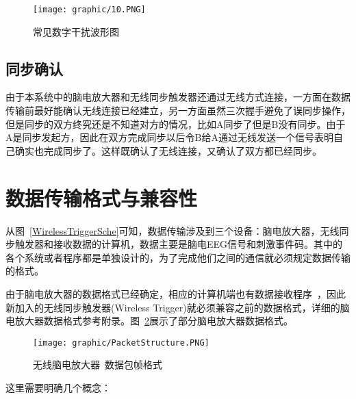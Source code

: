 \begin{figure}[!hbp]
\begin{center}
\texttt{[image: graphic/10.PNG]}
\caption{ 常见数字干扰波形图 \label{noiseDigital}}
\end{center}
\end{figure}

\subsection{同步确认}
由于本系统中的脑电放大器和无线同步触发器还通过无线方式连接，一方面在数据传输前最好能确认无线连接已经建立，另一方面虽然三次握手避免了误同步操作，但是同步的双方终究还是不知道对方的情况，比如A同步了但是B没有同步。由于A是同步发起方，因此在双方完成同步以后令B给A通过无线发送一个信号表明自己确实也完成同步了。这样既确认了无线连接，又确认了双方都已经同步。

\section{数据传输格式与兼容性}
	从图~\ref{WirelessTriggerSche}可知，数据传输涉及到三个设备：脑电放大器，无线同步触发器和接收数据的计算机，数据主要是脑电EEG信号和刺激事件码。其中的各个系统或者程序都是单独设计的，为了完成他们之间的通信就必须规定数据传输的格式。

	由于脑电放大器的数据格式已经确定，相应的计算机端也有数据接收程序~\cite{Xu2009}，因此新加入的无线同步触发器(Wireless Trigger)就必须兼容之前的数据格式，详细的脑电放大器数据格式参考附录。图~\ref{EEGpacketStruct}展示了部分脑电放大器数据格式。

\begin{figure}[!hbp]
\begin{center}
\texttt{[image: graphic/PacketStructure.PNG]}
\caption{ 无线脑电放大器~\cite{Xu2009}数据包帧格式 \label{EEGpacketStruct}}
\end{center}
\end{figure}

\newpage

这里需要明确几个概念：

